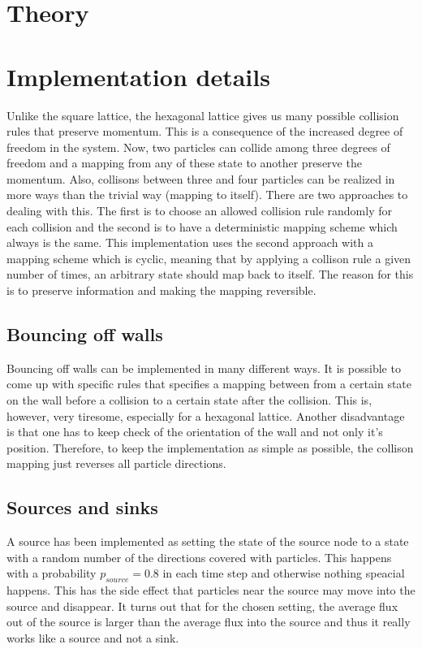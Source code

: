\documentclass[12pt,a4paper]{article}
\begin{document}
\section{Theory}
\label{sec:theory}

\section{Implementation details}
\label{sec:imp}

Unlike the square lattice, the hexagonal lattice gives us many possible collision 
rules that preserve momentum. This is a consequence of the increased degree of freedom
in the system. Now, two particles can collide among three degrees of freedom and a mapping
from any of these state to another preserve the momentum. Also, collisons between
three and four particles can be realized in more ways than the trivial way 
(mapping to itself). There are two approaches to dealing with this. The first is to
choose an allowed collision rule randomly for each collision and the second is to
have a deterministic mapping scheme which always is the same. This implementation
uses the second approach with a mapping scheme which is cyclic, meaning that by
applying a collison rule a given number of times, an arbitrary state should map back to
itself. The reason for this is to preserve information and making the mapping reversible.

\subsection{Bouncing off walls}
Bouncing off walls can be implemented in many different ways. It is possible to
come up with specific rules that specifies a mapping between from a certain state
on the wall before a collision to a certain state after the collision. This is, 
however, very tiresome, especially for a hexagonal lattice. Another disadvantage
is that one has to keep check of the orientation of the wall and not only it's 
position. Therefore, to keep the implementation as simple as possible, the collison
mapping just reverses all particle directions.

\subsection{Sources and sinks}
A source has been implemented as setting the state of the source node to a state
with a random number of the directions covered with particles. This happens with 
a probability $p_{source}=0.8$ in each time step and otherwise nothing speacial
happens. This has the side effect that particles near the source may move into the
source and disappear. It turns out that for the chosen setting, the average flux
out of the source is larger than the average flux into the source and thus it really
works like a source and not a sink.
\end{document}
